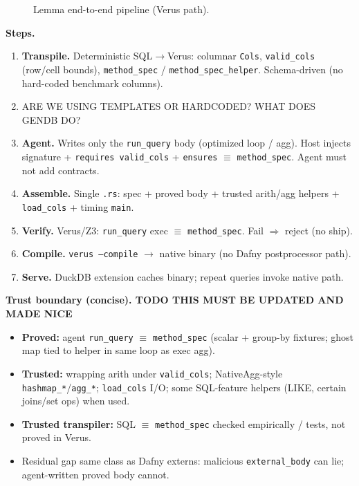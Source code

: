 \documentclass[sigconf, nonacm]{acmart}
\begin{document}
\begin{figure}[t]
  \centering
  \caption{Lemma end-to-end pipeline (Verus path).}
  \label{fig:pipeline}
\end{figure}

\noindent\textbf{Steps.}
\begin{enumerate}
  \item \textbf{Transpile.} Deterministic SQL$\to$Verus: columnar \texttt{Cols}, \texttt{valid\_cols} (row/cell bounds), \texttt{method\_spec} / \texttt{method\_spec\_helper}. Schema-driven (no hard-coded benchmark columns).
  \item ARE WE USING TEMPLATES OR HARDCODED? WHAT DOES GENDB DO?
  \item \textbf{Agent.} Writes only the \texttt{run\_query} body (optimized loop / agg). Host injects signature + \texttt{requires valid\_cols} + \texttt{ensures} $\equiv$ \texttt{method\_spec}. Agent must not add contracts.
  \item \textbf{Assemble.} Single \texttt{.rs}: spec + proved body + trusted arith/agg helpers + \texttt{load\_cols} + timing \texttt{main}.
  \item \textbf{Verify.} Verus/Z3: \texttt{run\_query} exec $\equiv$ \texttt{method\_spec}. Fail $\Rightarrow$ reject (no ship).
  \item \textbf{Compile.} \texttt{verus --compile} $\to$ native binary (no Dafny postprocessor path).
  \item \textbf{Serve.} DuckDB extension caches binary; repeat queries invoke native path.
\end{enumerate}

\noindent\textbf{Trust boundary (concise). TODO THIS MUST BE UPDATED AND MADE NICE}
\begin{itemize}
  \item \textbf{Proved:} agent \texttt{run\_query} $\equiv$ \texttt{method\_spec} (scalar + group-by fixtures; ghost map tied to helper in same loop as exec agg).
  \item \textbf{Trusted:} wrapping arith under \texttt{valid\_cols}; NativeAgg-style \texttt{hashmap\_*}/\texttt{agg\_*}; \texttt{load\_cols} I/O; some SQL-feature helpers (LIKE, certain joins/set ops) when used.
  \item \textbf{Trusted transpiler:} SQL $\equiv$ \texttt{method\_spec} checked empirically / tests, not proved in Verus.
  \item Residual gap same class as Dafny externs: malicious \texttt{external\_body} can lie; agent-written proved body cannot.
\end{itemize}
\end{document}

